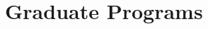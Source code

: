 \documentclass[10pt]{article}
\newcommand{\talk}[2]{
\noindent\marginpar{
   \scriptsize \scshape
  #2 \\ #1
}}
\begin{document}










%


\section*{Graduate Programs}
\end{document}
